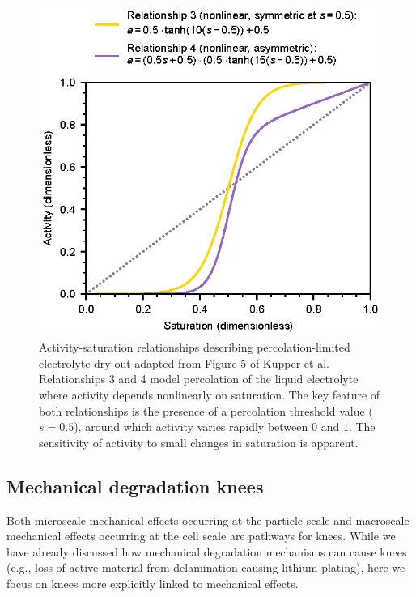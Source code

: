 \documentclass[journal=jpcl, manuscript=article, layout=onecolumn]{achemso}
\begin{document}
\begin{figure}[ht]
    \centering
    \includegraphics[scale=1.0]{figures/percolation.eps}
    \caption{Activity-saturation relationships describing percolation-limited electrolyte dry-out adapted from Figure 5 of Kupper et al.\cite{kupper_end--life_2018} Relationships 3 and 4 model percolation of the liquid electrolyte where activity depends nonlinearly on saturation. The key feature of both relationships is the presence of a percolation threshold value ($s=0.5$), around which activity varies rapidly between $0$ and $1$.
    The sensitivity of activity to small changes in saturation is apparent.}
    \label{fig:percolation}
\end{figure}

\subsection{Mechanical degradation knees}

Both microscale mechanical effects occurring at the particle scale and macroscale mechanical effects occurring at the cell scale are pathways for knees. 
While we have already discussed how mechanical degradation mechanisms can cause knees (e.g., loss of active material from delamination causing lithium plating), here we focus on knees more explicitly linked to mechanical effects.
\end{document}
